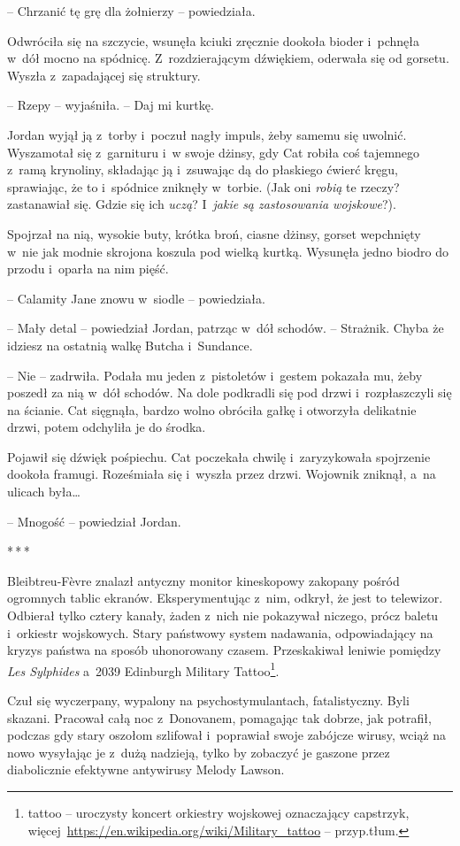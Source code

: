 \documentclass[oneside,polish,11pt,sfheadings]{mwbk}
\newcommand{\threeast}{\bigskip\par\centerline{*\,*\,*}\medskip\par}%
\begin{document}
-- Chrzanić tę grę dla żołnierzy -- powiedziała.

Odwróciła się na szczycie, wsunęła kciuki zręcznie dookoła bioder i~pchnęła w~dół mocno na spódnicę. Z~rozdzierającym dźwiękiem, oderwała
się od gorsetu. Wyszła z~zapadającej się struktury.

-- Rzepy -- wyjaśniła. -- Daj mi kurtkę.

Jordan wyjął ją z~torby i~poczuł nagły impuls, żeby samemu się uwolnić.
Wyszamotał się z~garnituru i~w swoje dżinsy, gdy Cat robiła coś
tajemnego z~ramą krynoliny, składając ją i~zsuwając dą do płaskiego
ćwierć kręgu, sprawiając, że to i~spódnice zniknęły w~torbie. (Jak oni
\emph{robią} te rzeczy? zastanawiał się. Gdzie się ich \emph{uczą}? I~\emph{jakie są zastosowania wojskowe}?).

Spojrzał na nią, wysokie buty, krótka broń, ciasne dżinsy, gorset
wepchnięty w~nie jak modnie skrojona koszula pod wielką kurtką. Wysunęła
jedno biodro do przodu i~oparła na nim pięść.

-- Calamity Jane znowu w~siodle -- powiedziała.

-- Mały detal -- powiedział Jordan, patrząc w~dół schodów. -- Strażnik.
Chyba że idziesz na ostatnią walkę Butcha i~Sundance.

-- Nie -- zadrwiła. Podała mu jeden z~pistoletów i~gestem pokazała mu,
żeby poszedł za nią w~dół schodów. Na dole podkradli się pod drzwi i~rozpłaszczyli się na ścianie. Cat sięgnąła, bardzo wolno obróciła gałkę
i otworzyła delikatnie drzwi, potem odchyliła je do środka.

Pojawił się dźwięk pośpiechu. Cat poczekała chwilę i~zaryzykowała
spojrzenie dookoła framugi. Roześmiała się i~wyszła przez drzwi.
Wojownik zniknął, a~na ulicach była\ldots

-- Mnogość -- powiedział Jordan.
  \threeast 

Bleibtreu-Fèvre znalazł antyczny monitor kineskopowy zakopany pośród
ogromnych tablic ekranów. Eksperymentując z~nim, odkrył, że jest to
telewizor. Odbierał tylko cztery kanały, żaden z~nich nie pokazywał
niczego, prócz baletu i~orkiestr wojskowych. Stary państwowy system
nadawania, odpowiadający na kryzys państwa na sposób uhonorowany czasem.
Przeskakiwał leniwie pomiędzy \emph{Les Sylphides} a~2039 Edinburgh
Military Tattoo\footnote{tattoo -- uroczysty koncert orkiestry wojskowej
oznaczający capstrzyk,
więcej~\url{https://en.wikipedia.org/wiki/Military\_tattoo} -- przyp.tłum.}. 

Czuł się wyczerpany, wypalony na psychostymulantach, fatalistyczny. Byli
skazani. Pracował całą noc z~Donovanem, pomagając tak dobrze, jak
potrafił, podczas gdy stary oszołom szlifował i~poprawiał swoje zabójcze
wirusy, wciąż na nowo wysyłając je z~dużą nadzieją, tylko by zobaczyć je
gaszone przez diabolicznie efektywne antywirusy Melody Lawson.
\end{document}

